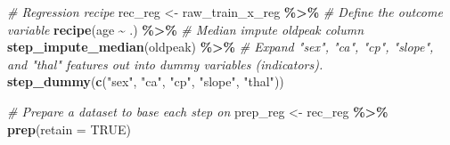 \documentclass[
]{book}
\newenvironment{Shaded}{\begin{snugshade}}{\end{snugshade}}
\newcommand{\AttributeTok}[1]{\textcolor[rgb]{0.13,0.29,0.53}{#1}}
\newcommand{\CommentTok}[1]{\textcolor[rgb]{0.56,0.35,0.01}{\textit{#1}}}
\newcommand{\ConstantTok}[1]{\textcolor[rgb]{0.56,0.35,0.01}{#1}}
\newcommand{\FunctionTok}[1]{\textcolor[rgb]{0.13,0.29,0.53}{\textbf{#1}}}
\newcommand{\NormalTok}[1]{#1}
\newcommand{\OtherTok}[1]{\textcolor[rgb]{0.56,0.35,0.01}{#1}}
\newcommand{\SpecialCharTok}[1]{\textcolor[rgb]{0.81,0.36,0.00}{\textbf{#1}}}
\newcommand{\StringTok}[1]{\textcolor[rgb]{0.31,0.60,0.02}{#1}}
\begin{document}
\begin{Shaded}
\begin{Highlighting}[]
\CommentTok{\# Regression recipe}
\NormalTok{rec\_reg }\OtherTok{\textless{}{-}}\NormalTok{ raw\_train\_x\_reg }\SpecialCharTok{\%\textgreater{}\%}
  \CommentTok{\# Define the outcome variable}
  \FunctionTok{recipe}\NormalTok{(age }\SpecialCharTok{\textasciitilde{}}\NormalTok{ .) }\SpecialCharTok{\%\textgreater{}\%}
  \CommentTok{\# Median impute oldpeak column}
  \FunctionTok{step\_impute\_median}\NormalTok{(oldpeak) }\SpecialCharTok{\%\textgreater{}\%}
  \CommentTok{\# Expand "sex", "ca", "cp", "slope", and "thal" features out into dummy variables (indicators).}
  \FunctionTok{step\_dummy}\NormalTok{(}\FunctionTok{c}\NormalTok{(}\StringTok{"sex"}\NormalTok{, }\StringTok{"ca"}\NormalTok{, }\StringTok{"cp"}\NormalTok{, }\StringTok{"slope"}\NormalTok{, }\StringTok{"thal"}\NormalTok{))}

\CommentTok{\# Prepare a dataset to base each step on}
\NormalTok{prep\_reg }\OtherTok{\textless{}{-}}\NormalTok{ rec\_reg }\SpecialCharTok{\%\textgreater{}\%} \FunctionTok{prep}\NormalTok{(}\AttributeTok{retain =} \ConstantTok{TRUE}\NormalTok{)}
\end{Highlighting}
\end{Shaded}

\begin{Shaded}
\end{Shaded}
\end{document}
